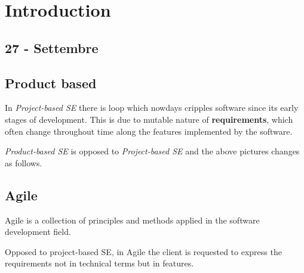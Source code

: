 \chapter{Introduction}
\section*{27 - Settembre}
\section{Product based}
In \textit{Project-based SE} there is loop which nowdays cripples software since its early stages of development.
This is due to mutable nature of \textbf{requirements}, which often change throughout time along the features implemented by the software.
\begin{center}
\end{center}

\textit{Product-based SE} is opposed to \textit{Project-based SE} and the above pictures changes as follows.

\begin{center}
\end{center}

\section{Agile}
Agile is a collection of principles and methods applied in the software development field.
\nl

Opposed to project-based SE, in Agile the client is requested to express the requirements not in technical terms but in features.

